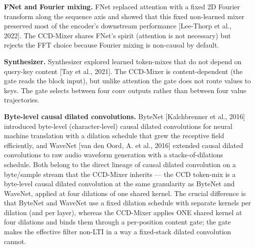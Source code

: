 \documentclass[11pt]{article}
\begin{document}
\textbf{FNet and Fourier mixing.} FNet replaced attention with a fixed 2D Fourier transform along the sequence axis and showed that this fixed non-learned mixer preserved most of the encoder's downstream performance [Lee-Thorp et al., 2022]. The CCD-Mixer shares FNet's spirit (attention is not necessary) but rejects the FFT choice because Fourier mixing is non-causal by default.

\textbf{Synthesizer.} Synthesizer explored learned token-mixes that do not depend on query-key content [Tay et al., 2021]. The CCD-Mixer is content-dependent (the gate reads the block input), but unlike attention the gate does not route values to keys. The gate selects between four conv outputs rather than between four value trajectories.

\textbf{Byte-level causal dilated convolutions.} ByteNet [Kalchbrenner et al., 2016] introduced byte-level (character-level) causal dilated convolutions for neural machine translation with a dilation schedule that grew the receptive field efficiently, and WaveNet [van den Oord, A. et al., 2016] extended causal dilated convolutions to raw audio waveform generation with a stacks-of-dilations schedule. Both belong to the direct lineage of causal dilated convolution on a byte/sample stream that the CCD-Mixer inherits --- the CCD token-mix is a byte-level causal dilated convolution at the same granularity as ByteNet and WaveNet, applied at four dilations of one shared kernel. The crucial difference is that ByteNet and WaveNet use a fixed dilation schedule with separate kernels per dilation (and per layer), whereas the CCD-Mixer applies ONE shared kernel at four dilations and binds them through a per-position content gate; the gate makes the effective filter non-LTI in a way a fixed-stack dilated convolution cannot.
\end{document}
